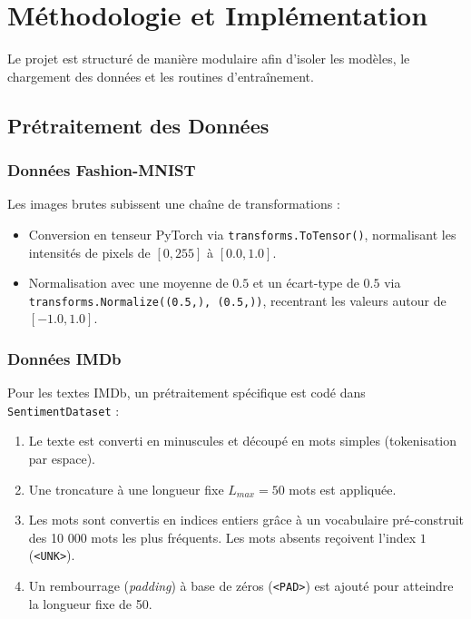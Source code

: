 \documentclass[12pt,a4paper,oneside]{report}
\begin{document}
\chapter{Méthodologie et Implémentation}

Le projet est structuré de manière modulaire afin d'isoler les modèles, le chargement des données et les routines d'entraînement.

\section{Prétraitement des Données}

\subsection{Données Fashion-MNIST}
Les images brutes subissent une chaîne de transformations :
\begin{itemize}
    \item Conversion en tenseur PyTorch via \texttt{transforms.ToTensor()}, normalisant les intensités de pixels de $[0, 255]$ à $[0.0, 1.0]$.
    \item Normalisation avec une moyenne de $0.5$ et un écart-type de $0.5$ via \texttt{transforms.Normalize((0.5,), (0.5,))}, recentrant les valeurs autour de $[-1.0, 1.0]$.
\end{itemize}

\subsection{Données IMDb}
Pour les textes IMDb, un prétraitement spécifique est codé dans \texttt{SentimentDataset} :
\begin{enumerate}
    \item Le texte est converti en minuscules et découpé en mots simples (tokenisation par espace).
    \item Une troncature à une longueur fixe $L_{max} = 50$ mots est appliquée.
    \item Les mots sont convertis en indices entiers grâce à un vocabulaire pré-construit des 10 000 mots les plus fréquents. Les mots absents reçoivent l'index $1$ (\texttt{<UNK>}).
    \item Un rembourrage (\textit{padding}) à base de zéros (\texttt{<PAD>}) est ajouté pour atteindre la longueur fixe de 50.
\end{enumerate}
\end{document}
